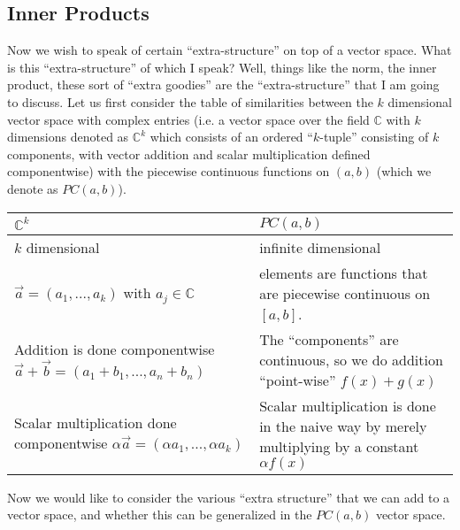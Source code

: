 
\subsection{Inner Products}

Now we wish to speak of certain ``extra-structure'' on top
of a vector space. What is this ``extra-structure'' of which
I speak? Well, things like the norm, the inner product,
these sort of ``extra goodies'' are the ``extra-structure''
that I am going to discuss. Let us first consider the table
of similarities between the $k$ dimensional vector space
with complex entries (i.e. a vector space over the field
$\mathbb{C}$ with $k$ dimensions denoted as $\mathbb{C}^k$
which consists of an ordered ``$k$-tuple'' consisting of $k$
components, with vector addition and scalar multiplication
defined componentwise) with the piecewise continuous
functions on $(a,b)$ (which we denote as $PC(a,b)$).

\begin{tabular}{|p{}|p{}|}
\hline 
$\mathbb{C}^{k}$ & $PC(a,b)$ \\ 
\hline
$k$ dimensional & infinite dimensional \\ \hline
$\vec{a} = (a_1,...,a_k)$ with $a_j\in\mathbb{C}$ & elements
are functions that are piecewise continuous on
$[a,b]$. \\ \hline
Addition is done componentwise \newline $\vec{a}+\vec{b}=(a_1+b_1,...,a_n+b_n)$ & The
``components'' are continuous, so we do addition
``point-wise'' \newline $f(x)+g(x)$ \\ \hline
Scalar multiplication done componentwise\newline
$\alpha\vec{a}=(\alpha a_1,...,\alpha a_k)$ & Scalar
multiplication is done in the naive way by merely
multiplying by a constant
$\alpha f(x)$ \\ \hline
\end{tabular}

Now we would like to consider the various ``extra
structure'' that we can add to a vector space, and whether
this can be generalized in the $PC(a,b)$ vector space.

